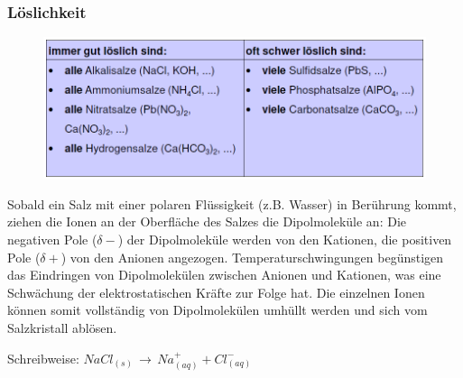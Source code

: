 \subsubsection{Löslichkeit}
\begin{figure}[h!]
	\centering
	\includegraphics[width=0.9\linewidth]{images/5_Tabelle_Loeslichkeit.png}
\end{figure}
Sobald ein Salz mit einer polaren Flüssigkeit (z.B. Wasser) in Berührung kommt, ziehen die Ionen an der Oberfläche des Salzes die Dipolmoleküle an: Die negativen Pole ($\delta-$) der Dipolmoleküle werden von den Kationen, die positiven Pole ($\delta+$) von den Anionen angezogen. Temperaturschwingungen begünstigen das Eindringen von Dipolmolekülen zwischen Anionen und Kationen, was eine Schwächung der elektrostatischen Kräfte zur Folge hat. Die einzelnen Ionen können somit vollständig von Dipolmolekülen umhüllt werden und sich vom Salzkristall ablösen.

Schreibweise: $NaCl_{(s)} \, \rightarrow \, Na^+_{(aq)} + Cl^-_{(aq)}$